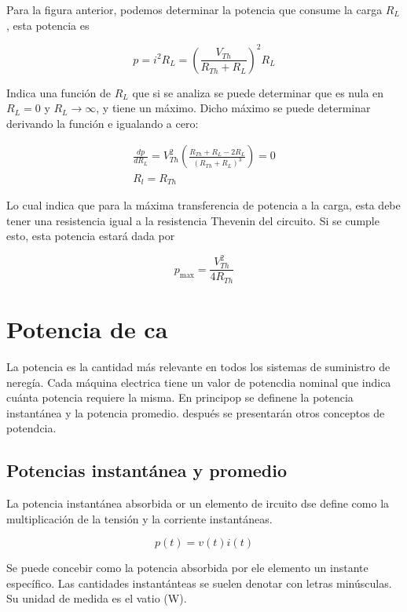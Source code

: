 Para la figura anterior, podemos determinar la potencia que consume la carga $R_L$, esta potencia es

\begin{equation*}
p = i^2 R_L = \left( \frac{V_{Th}}{R_{Th}+R_L} \right)^2 R_L
\end{equation*}

Indica una función de $R_L$ que si se analiza se puede determinar que es nula en $R_L=0$ y $R_L \to \infty$, y tiene un máximo. Dicho máximo se puede determinar derivando la función e igualando a cero:

\begin{eqnarray*}
\frac{d p}{d R_L} = V_{Th}^{2} \left(  \frac{R_{Th}+R_L - 2R_L}{(R_{Th}+R_L)^3} \right) = 0 \\
R_l = R_{Th}
\end{eqnarray*}

Lo cual indica que para la máxima transferencia de potencia a la carga, esta debe tener una resistencia igual a la resistencia Thevenin del circuito. Si se cumple esto, esta potencia estará dada por

\begin{equation*}
p_{\text{max}} = \frac{V_{Th}^2}{4 R_{Th}}
\end{equation*}





\section{Potencia de ca}


La potencia es la cantidad más relevante en todos los sistemas de suministro de neregía. Cada máquina electrica tiene un valor de potencdia nominal que indica cuánta potencia requiere la misma. En principop se definene la potencia instantánea y la potencia promedio. después se presentarán otros conceptos de potendcia.


\subsection{Potencias instantánea y promedio} 
La potencia instantánea absorbida or un elemento de ircuito dse define como la multiplicación de la tensión y la corriente instantáneas.

\begin{equation*}
    p(t) = v(t) i(t)
\end{equation*}

Se puede concebir como la potencia absorbida por ele elemento un instante específico. Las cantidades instantánteas se suelen denotar con letras minúsculas. Su unidad de medida es el vatio (W). \\

